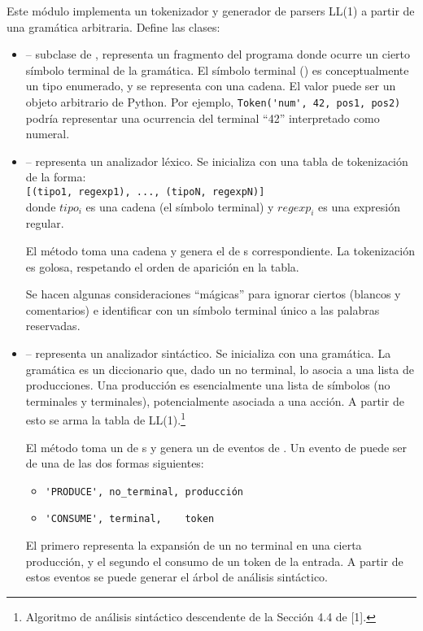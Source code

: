 \documentclass{article}
\begin{document}
Este m\'odulo implementa un tokenizador y
generador de parsers LL(1) a partir de una gram\'atica
arbitraria. Define las clases:
\begin{itemize}
\item {} -- subclase de ,
      representa un fragmento del programa donde ocurre un
      cierto s\'imbolo terminal de la gram\'atica.
      El s\'imbolo terminal () es
      conceptualmente un tipo
      enumerado, y se representa con una cadena.
      El valor puede ser un objeto arbitrario de Python.
      Por ejemplo, \verb|Token('num', 42, pos1, pos2)|
      podr\'ia representar una ocurrencia del terminal ``42''
      interpretado como numeral.
\item {} -- representa un analizador l\'exico.
      Se inicializa con una tabla de tokenizaci\'on de la
      forma:\\
       \verb|[(tipo1, regexp1), ..., (tipoN, regexpN)]|\\
      donde $tipo_i$ es una cadena (el s\'imbolo terminal) y
      $regexp_i$ es una expresi\'on regular.

      El m\'etodo  toma una cadena y genera
      el  de s corres\-pon\-dien\-te.
      La tokenizaci\'on es golosa, respetando el orden
      de aparici\'on en la tabla.

      Se hacen algunas consideraciones ``m\'agicas'' para ignorar ciertos
       (blancos y comentarios) e identificar con un s\'imbolo
      terminal \'unico a las palabras reservadas.

\item {} -- representa un analizador sint\'actico.
      Se inicializa con una gram\'atica. La gram\'atica es
      un diccionario que, dado un no terminal, lo asocia a una
      lista de producciones.
      Una producci\'on es esencialmente una lista de s\'imbolos
      (no terminales y terminales), potencialmente asociada a
      una acci\'on.
      A partir de esto se arma la tabla
      de  LL(1).\footnote{
      Algoritmo de an\'alisis sint\'actico descendente de la Secci\'on 4.4 de [1].}

      El m\'etodo  toma un  de s
      y genera un  de eventos de .
      Un evento de  puede ser de una de las dos formas siguientes:
      \begin{itemize}
      \item \verb|'PRODUCE', no_terminal, producción|
      \item \verb|'CONSUME', terminal,    token|
      \end{itemize}
      El primero representa la expansi\'on de un no terminal
      en una cierta producci\'on, y el segundo el consumo de
      un token de la entrada. A partir de estos eventos se
      puede generar el \'arbol de an\'alisis sint\'actico.


\end{itemize}
\end{document}

